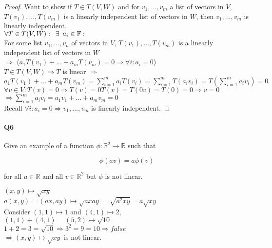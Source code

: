 \documentclass{article}
\begin{document}
\begin{proof} Want to show if $T \in T(V,W)$
   and for $v_1, ... ,v_m$ a list of vectors in $V$, $T(v_1), ... ,T(v_m)$ is a linearly
  independent list of vectors in $W$, then $v_1, ... ,v_m$ is linearly
  independent.\\
  $\forall T \in T(V,W):\enskip \exists\enskip a_i \in \mathbb{F}:$\\
  For some list $v_1, ... ,v_n$ of vectors in $V$, $T(v_1), ... ,T(v_m)$ is a linearly
  independent list of vectors in $W$\\
  $\Rightarrow$ ($a_1T(v_1) + ... + a_mT(v_m) = 0 \Rightarrow \forall
  i: a_i = 0 $)\\
  $T \in T(V,W) \Rightarrow T$ is linear $\Rightarrow$ \\
  $a_1T(v_1) + ... + a_mT(v_m) = \sum_{i=1}^ma_iT(v_i)=
  \sum_{i=1}^mT(a_iv_i) = T(\sum_{i=1}^ma_iv_i)=0$\\
  $\forall v \in V:  T(v) = 0 \Rightarrow T(v) = 0T(v) = T(0v) = T(0)
  = 0 \Rightarrow v = 0$\\
  $\Rightarrow \sum_{i=1}^ma_iv_i = a_1v_1 + ... + a_mv_m = 0$\\
  Recall $\forall i: a_i=0 \Rightarrow v_1, ... , v_m$ is linearly independent.

\end{proof}

\paragraph{Q6} Give an example of a function $\phi : \mathbb{R}^2 →
\mathbb{R}$ such that

\[\phi(av) = a\phi(v)\]

for all $a ∈ \mathbb{R}$ and all $v ∈ \mathbb{R}^2$ but $\phi$ is not
linear.\vspace{1.618em}

$(x,y)\mapsto \sqrt{xy}$\\
$a(x,y)=(ax,ay)\mapsto \sqrt{axay} = \sqrt{a^2xy} = a\sqrt{xy}$\\
Consider $(1,1) \mapsto 1$ and $(4,1) \mapsto 2$,\\
$(1,1) + (4,1) = (5,2) \mapsto \sqrt{10}$\\
$1+2 = 3 = \sqrt{10} \Rightarrow 3^2 = 9 = 10 \Rightarrow false$\\
$\Rightarrow (x,y)\mapsto \sqrt{xy}$ is not linear.
\end{document}

